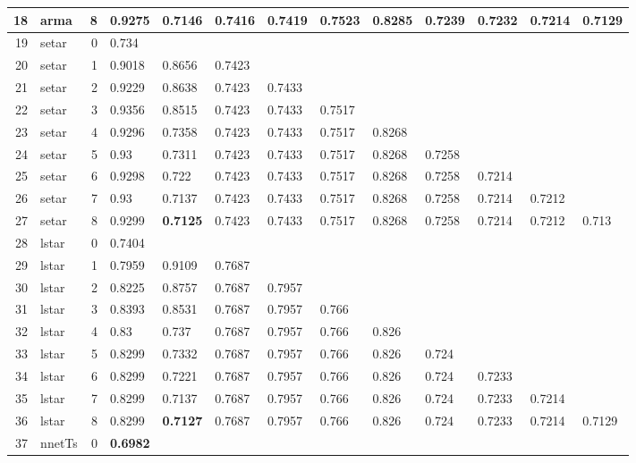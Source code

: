 \documentclass[10pt,a4paper]{article}
\begin{document}
\begin{table}[ht]
\begin{tabular}{rlrllllllllll}
  18 & arma &     8 & 0.9275 & 0.7146 & 0.7416 & 0.7419 & 0.7523 & 0.8285 & 0.7239 & 0.7232 & 0.7214 & \textbf{0.7129} \\ 
   \hline
19 & setar &     0 & 0.734 &  &  &  &  &  &  &  &  &  \\ 
  20 & setar &     1 & 0.9018 & 0.8656 & 0.7423 &  &  &  &  &  &  &  \\ 
  21 & setar &     2 & 0.9229 & 0.8638 & 0.7423 & 0.7433 &  &  &  &  &  &  \\ 
  22 & setar &     3 & 0.9356 & 0.8515 & 0.7423 & 0.7433 & 0.7517 &  &  &  &  &  \\ 
  23 & setar &     4 & 0.9296 & 0.7358 & 0.7423 & 0.7433 & 0.7517 & 0.8268 &  &  &  &  \\ 
  24 & setar &     5 & 0.93 & 0.7311 & 0.7423 & 0.7433 & 0.7517 & 0.8268 & 0.7258 &  &  &  \\ 
  25 & setar &     6 & 0.9298 & 0.722 & 0.7423 & 0.7433 & 0.7517 & 0.8268 & 0.7258 & 0.7214 &  &  \\ 
  26 & setar &     7 & 0.93 & 0.7137 & 0.7423 & 0.7433 & 0.7517 & 0.8268 & 0.7258 & 0.7214 & 0.7212 &  \\ 
  27 & setar &     8 & 0.9299 & \textbf{0.7125} & 0.7423 & 0.7433 & 0.7517 & 0.8268 & 0.7258 & 0.7214 & 0.7212 & 0.713 \\ 
   \hline
28 & lstar &     0 & 0.7404 &  &  &  &  &  &  &  &  &  \\ 
  29 & lstar &     1 & 0.7959 & 0.9109 & 0.7687 &  &  &  &  &  &  &  \\ 
  30 & lstar &     2 & 0.8225 & 0.8757 & 0.7687 & 0.7957 &  &  &  &  &  &  \\ 
  31 & lstar &     3 & 0.8393 & 0.8531 & 0.7687 & 0.7957 & 0.766 &  &  &  &  &  \\ 
  32 & lstar &     4 & 0.83 & 0.737 & 0.7687 & 0.7957 & 0.766 & 0.826 &  &  &  &  \\ 
  33 & lstar &     5 & 0.8299 & 0.7332 & 0.7687 & 0.7957 & 0.766 & 0.826 & 0.724 &  &  &  \\ 
  34 & lstar &     6 & 0.8299 & 0.7221 & 0.7687 & 0.7957 & 0.766 & 0.826 & 0.724 & 0.7233 &  &  \\ 
  35 & lstar &     7 & 0.8299 & 0.7137 & 0.7687 & 0.7957 & 0.766 & 0.826 & 0.724 & 0.7233 & 0.7214 &  \\ 
  36 & lstar &     8 & 0.8299 & \textbf{0.7127} & 0.7687 & 0.7957 & 0.766 & 0.826 & 0.724 & 0.7233 & 0.7214 & 0.7129 \\ 
   \hline
37 & nnetTs &     0 & \textbf{0.6982} &  &  &  &  &  &  &  &  &  \\ 

\end{tabular}
\end{table}
\end{document}
